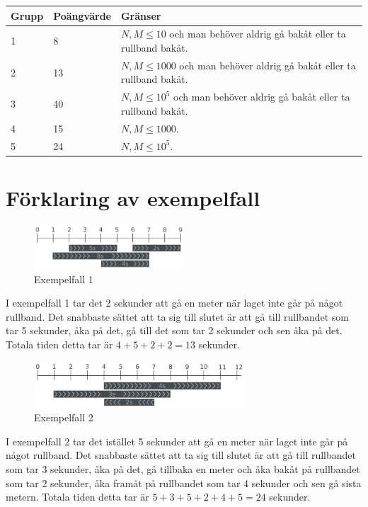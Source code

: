 \noindent
\begin{tabular}{| l | l | l |}
\hline
Grupp & Poängvärde & Gränser \\ \hline
1     & 8          &  $N,M \le 10$ och man behöver aldrig gå bakåt eller ta rullband bakåt.\\ \hline
2     & 13         &  $N,M \le 1000$ och man behöver aldrig gå bakåt eller ta rullband bakåt.\\ \hline
3     & 40         &  $N,M \le 10^5$ och man behöver aldrig gå bakåt eller ta rullband bakåt.\\ \hline
4     & 15         &  $N,M \le 1000$. \\ \hline
5     & 24         &  $N,M \le 10^5$. \\ \hline
\end{tabular}

\section*{Förklaring av exempelfall}

\begin{figure}[h]
	\centering
\includegraphics[width=0.5\textwidth]{sample1}
\caption{Exempelfall 1}
\end{figure}
I exempelfall 1 tar det 2 sekunder att gå en meter när laget inte går på något rullband.
Det snabbaste sättet att ta sig till slutet är att gå till rullbandet som
tar 5 sekunder, åka på det, gå till det som tar 2 sekunder och sen åka på det.
Totala tiden detta tar är $4+5+2+2=13$ sekunder.



\begin{figure}[h]
	\centering
\includegraphics[width=0.7\textwidth]{sample2}
\caption{Exempelfall 2}
\end{figure}
I exempelfall 2 tar det istället 5 sekunder att gå en meter när laget inte går på något rullband.
Det snabbaste sättet att ta sig till slutet är att gå till rullbandet som
tar 3 sekunder, åka på det, gå tillbaka en meter och åka bakåt på
rullbandet som tar 2 sekunder, åka framåt på rullbandet som tar 4 sekunder
och sen gå sista metern.
Totala tiden detta tar är $5+3+5+2+4+5=24$ sekunder.
